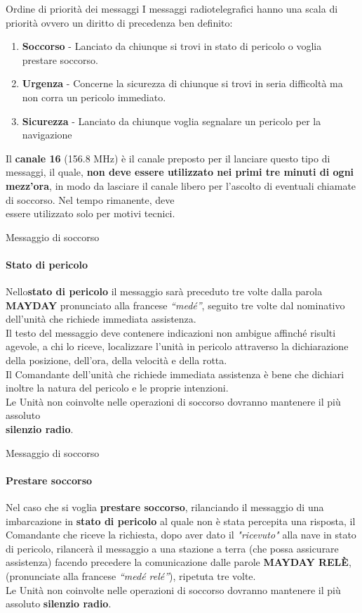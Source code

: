 \documentclass[aspectratio=169]{beamer}
\begin{document}
\begin{frame}{Ordine di priorità dei messaggi}
	I messaggi radiotelegrafici hanno una scala di priorità ovvero un diritto di precedenza ben definito:\\
	\medskip
	\begin{enumerate}
		\item \textbf{Soccorso} - Lanciato da chiunque si trovi in stato di pericolo o voglia prestare soccorso.
		\item \textbf{Urgenza} - Concerne la sicurezza di chiunque si trovi in seria difficoltà ma non corra un pericolo immediato.
		\item \textbf{Sicurezza} - Lanciato da chiunque voglia segnalare un pericolo per la navigazione
	\end{enumerate}
\medskip
Il \textbf{canale 16} (156.8 MHz) è il canale preposto per il lanciare questo tipo di messaggi, il quale, \textbf{non deve essere utilizzato nei primi tre minuti di ogni mezz'ora}, in modo da lasciare il canale libero per l'ascolto di eventuali chiamate di soccorso. Nel tempo rimanente, deve \\essere utilizzato solo per motivi tecnici.
\end{frame}

\begin{frame}{Messaggio di soccorso}
	\framesubtitle{Stato di pericolo}
	
	Nello\textbf{stato di pericolo} il messaggio sarà preceduto tre volte dalla parola \textbf{MAYDAY} pronunciato alla francese \emph{“medé”}, seguito tre volte dal nominativo dell'unità che richiede immediata assistenza.\\
	Il testo del messaggio deve contenere indicazioni non ambigue affinché risulti agevole, a chi lo riceve, localizzare l'unità in pericolo attraverso la dichiarazione della posizione, dell'ora, della velocità e della rotta.\\
	Il Comandante dell'unità che richiede immediata assistenza è bene che dichiari inoltre la natura del pericolo e le proprie intenzioni.\\
	\medskip
	{\textcolor{red!80}{Le Unità non coinvolte nelle operazioni di soccorso dovranno mantenere il più assoluto\\ \textbf{silenzio radio}.}}
\end{frame}


\begin{frame}{Messaggio di soccorso}
	\framesubtitle{Prestare soccorso}
	Nel caso che si voglia \textbf{prestare soccorso}, rilanciando il messaggio di una imbarcazione in \textbf{stato di pericolo} al quale non è stata percepita una risposta, il Comandante che riceve la richiesta, dopo aver dato il \emph{"ricevuto"} alla nave in stato di pericolo, rilancerà il messaggio a una stazione a terra (che possa assicurare assistenza)  facendo precedere la comunicazione dalle parole \textbf{MAYDAY RELÈ}, (pronunciate alla francese \emph{“medé relé”}), ripetuta tre volte.\\
	\medskip
	{\textcolor{red!80}{Le Unità non coinvolte nelle operazioni di soccorso dovranno mantenere il più assoluto \textbf{silenzio radio}.}}
\end{frame}
\end{document}
